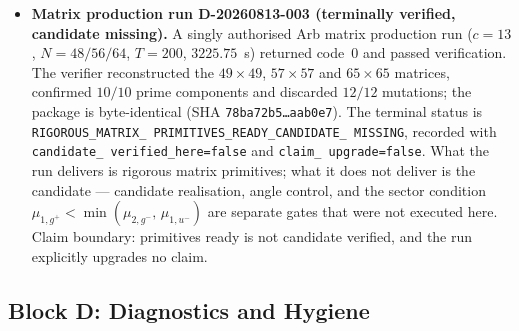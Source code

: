 \documentclass[12pt,a4paper]{article}
\theoremstyle{definition}
\theoremstyle{remark}
\begin{document}
\begin{itemize}
  \item \textbf{Matrix production run D-20260813-003 (terminally verified,
    candidate missing).} A singly authorised Arb matrix production run
    ($c = 13$, $N = 48/56/64$, $T = 200$, $3225.75$~s) returned code~$0$
    and passed verification. The verifier reconstructed the
    $49\times 49$, $57\times 57$ and $65\times 65$ matrices, confirmed
    $10/10$ prime components and discarded $12/12$ mutations; the package
    is byte-identical (SHA \texttt{78ba72b5\ldots aab0e7}). The terminal
    status is \texttt{RIGOROUS\_\allowbreak MATRIX\_\allowbreak
    PRIMITIVES\_\allowbreak READY\_\allowbreak CANDIDATE\_\allowbreak
    MISSING}, recorded with \texttt{candidate\_\allowbreak
    verified\_\allowbreak here=false} and \texttt{claim\_\allowbreak
    upgrade=false}. What the run delivers is rigorous matrix primitives;
    what it does not deliver is the candidate --- candidate realisation,
    angle control, and the sector condition
    $\mu_{1,g^+} < \min(\mu_{2,g^-},\, \mu_{1,u^-})$ are separate gates
    that were not executed here. Claim boundary: primitives ready is not
    candidate verified, and the run explicitly upgrades no claim.
\end{itemize}

\subsection{Block D: Diagnostics and Hygiene}
\label{sec:v32-block-d}
\end{document}
